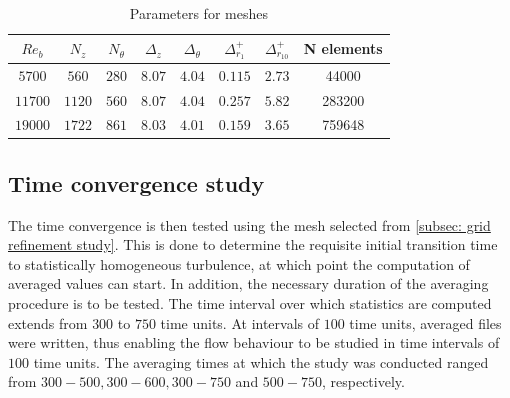 \begin{table}
    \centering
    \caption{Parameters for meshes}
    \begin{tabular}{ c c c c c c c c } 
        \hline
        $Re_b$  & $N_z$     & $N_{\theta}$  & $\Delta_z$    & $\Delta_\theta$   & $\Delta^+_{r_1}$  & $\Delta^+_{r_{10}}$   & N elements \\
        \hline
        $5700$  & $560$     & $280$         & $8.07$        & $4.04$            & $0.115$           & $2.73$                & 44000\\ 
        $11700$ & $1120$    & $560$         & $8.07$        & $4.04$            & $0.257$           & $5.82$                & 283200\\     
        $19000$ & $1722$    & $861$         & $8.03$        & $4.01$            & $0.159$           & $3.65$                & 759648\\ 
        \hline
    \end{tabular}
    \label{tab: parameters chosen meshes}
\end{table}

\subsection{Time convergence study}\label{subsec: Time convergence study}
The time convergence is then tested using the mesh selected from \autoref{subsec: grid refinement study}.
This is done to determine the  requisite initial transition time to statistically homogeneous turbulence, at which point the computation of averaged values can start.
In addition, the necessary duration of the averaging procedure is to be tested.
The time interval over which statistics are computed extends from $300$ to $750$ time units.
At intervals of $100$ time units, averaged files were written, thus enabling the flow behaviour to be studied in time intervals of $100$ time units.
The averaging times at which the study was conducted ranged from  $300-500, 300 - 600, 300-750$ and $500-750$, respectively.

